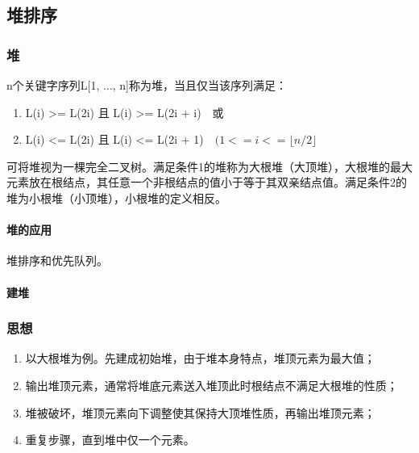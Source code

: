 \subsection{堆排序}

\subsubsection{堆}
n个关键字序列L[1, ..., n]称为堆，当且仅当该序列满足：
\begin{enumerate}
    \item L(i) >= L(2i) 且 L(i) >= L(2i + i)\ \ 或
    \item L(i) <= L(2i) 且 L(i) <= L(2i + 1)\ \ \((1 <= i <= \lfloor n / 2\rfloor\)
\end{enumerate}

可将堆视为一棵完全二叉树。满足条件1的堆称为大根堆（大顶堆），大根堆的最大元素放在根结点，其任意一个非根结点的值小于等于其双亲结点值。满足条件2的堆为小根堆（小顶堆），小根堆的定义相反。

\paragraph{堆的应用}
堆排序和优先队列。

\paragraph{建堆}


\subsubsection{思想}
\begin{enumerate}
    \item 以大根堆为例。先建成初始堆，由于堆本身特点，堆顶元素为最大值；
    \item 输出堆顶元素，通常将堆底元素送入堆顶此时根结点不满足大根堆的性质；
    \item 堆被破坏，堆顶元素向下调整使其保持大顶堆性质，再输出堆顶元素；
    \item 重复步骤，直到堆中仅一个元素。
\end{enumerate}






